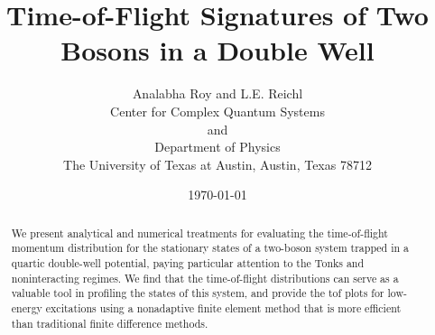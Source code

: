 \documentclass{article}
\begin{document}
\title{Time-of-Flight Signatures of Two Bosons in a Double Well}
\author{Analabha Roy and L.E. Reichl \\
Center for Complex Quantum Systems\\
and\\
Department of Physics\\
The University of Texas at Austin, Austin, Texas 78712\\}
\date{\today }
\maketitle
%
\begin{abstract}
We present analytical and numerical treatments for evaluating the time-of-flight momentum distribution for the stationary states of a two-boson system trapped in a quartic double-well potential, paying particular attention to the Tonks and noninteracting regimes. We find that the time-of-flight distributions can serve as a valuable tool in profiling the states of this system, and provide the tof plots for low-energy excitations using a nonadaptive finite element method that is more efficient than traditional finite difference methods.
%
\end{abstract}
%
\end{document}
